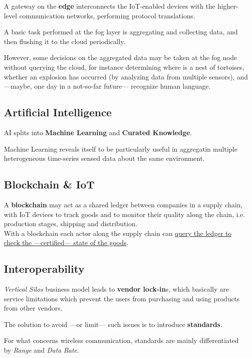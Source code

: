 A gateway on the \textbf{edge} interconnects the IoT-enabled devices with the higher-level communication networks, performing protocol translations.

A basic task performed at the fog layer is  aggregating and collecting data, and then flushing it to the cloud periodically.

However, some decisions on the aggregated data may be taken at the fog node without querying the cloud, for instance determining where is a nest of tortoises, whether an explosion has occurred (by analyzing data from multiple sensors), and ---maybe, one day in a not-so-far future--- recognize human language.


\subsection{Artificial Intelligence}
AI splits into \textbf{Machine Learning} and \textbf{Curated Knowledge}.

Machine Learning reveals itself to be particularly useful in aggregatin multiple heterogeneous time-series sensed data about the same environment.


\subsection{Blockchain \& IoT}
A \textbf{blockchain} may act as a shared ledger between companies in a supply chain, with IoT devices to track goods and to monitor their quality along the chain, i.e. production stages, shipping and distribution.\\
With a blockchain each actor along the supply chain can \ul{query the ledger to check the ---certified--- state of the goods}.

\subsection{Interoperability}
\textit{Vertical Silos} business model leads to \textbf{vendor lock-in}s, which basically are service limitations which prevent the users from purchasing and using products from other vendors.
\nl
\nl

The solution to avoid ---or limit--- such issues is to introduce \textbf{standards}.

For what concerns wireless communication, standards are mainly differentiated by \textit{Range} and \textit{Data Rate}.


